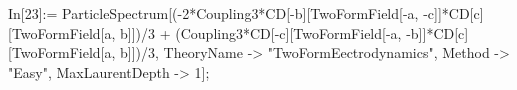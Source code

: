 In[23]:= ParticleSpectrum[(-2*Coupling3*CD[-b][TwoFormField[-a, -c]]*CD[c][TwoFormField[a, b]])/3 + (Coupling3*CD[-c][TwoFormField[-a, -b]]*CD[c][TwoFormField[a, b]])/3, TheoryName -> "TwoFormEectrodynamics", Method -> "Easy", MaxLaurentDepth -> 1]; 